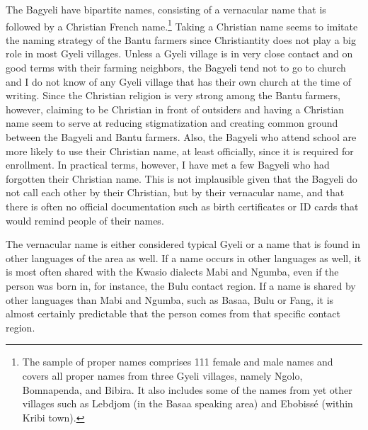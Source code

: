 The Bagyeli have bipartite names, consisting of a vernacular name that is followed by a Christian French name.\footnote{The sample of proper names comprises 111 female and male names and covers all proper names from three Gyeli villages, namely Ngolo, Bomnapenda, and Bibira. It also includes some of the names from yet other villages such as Lebdjom (in the Basaa speaking area) and Ebobissé (within Kribi town).} Taking a Christian name seems to imitate the naming strategy of the Bantu farmers since Christiantity does not play a big role in most Gyeli villages. Unless a Gyeli village is in very close contact and on good terms with their farming neighbors, the Bagyeli tend not to go to church and I do not know of any Gyeli village that has their own church at the time of writing. Since the Christian religion is very strong among the Bantu farmers, however, claiming to be Christian in front of outsiders and having a Christian name seem to serve at reducing stigmatization and creating common ground between the Bagyeli and Bantu farmers. Also, the Bagyeli who attend school are more likely to use their Christian name, at least officially, since it is required for enrollment.  In practical terms, however, I have met a few Bagyeli who had forgotten their Christian name. This is not implausible given that the Bagyeli do not call each other by their Christian, but by their vernacular name, and that there is often no official documentation such as birth certificates or ID cards that would remind people of their names. 

The vernacular name is either considered typical Gyeli or a name that is found in other languages of the area as well. If a name occurs in other languages as well, it is most often shared with the Kwasio dialects Mabi and Ngumba, even if the person was born in, for instance, the Bulu contact region. If a name is shared by other languages than Mabi and Ngumba, such as Basaa, Bulu or Fang, it is almost certainly predictable that the person comes from that specific contact region.

